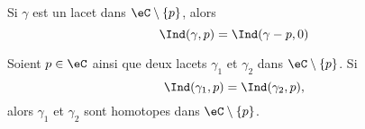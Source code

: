 \begin{lemma}    \label{LEMooCTIBooNRAyZH}
	Si \( \gamma\) est un lacet dans \( \eC\setminus\{ p \}\), alors
	\begin{equation}
		\Ind(\gamma,p)=\Ind(\gamma-p,0)
	\end{equation}
\end{lemma}

\begin{proposition}       \label{PROPooPRIIooKWCHBZ}
	Soient \( p\in \eC\) ainsi que deux lacets \( \gamma_1\) et \( \gamma_2\) dans \( \eC\setminus\{ p \}\). Si
	\begin{equation}
		\Ind(\gamma_1,p)=\Ind(\gamma_2,p),
	\end{equation}
	alors \( \gamma_1\) et \( \gamma_2\) sont homotopes dans \( \eC\setminus \{ p \}\).
\end{proposition}

